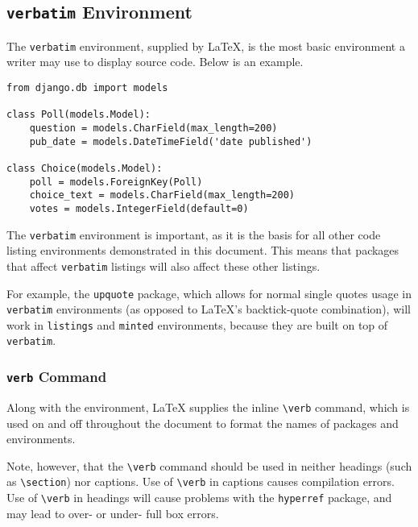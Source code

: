 
\subsection{\texttt{verbatim} Environment}

The \verb|verbatim| environment, supplied by \LaTeX , is the most basic environment a writer may use to display source code. Below is an example.

\begin{verbatim}
from django.db import models

class Poll(models.Model):
    question = models.CharField(max_length=200)
    pub_date = models.DateTimeField('date published')

class Choice(models.Model):
    poll = models.ForeignKey(Poll)
    choice_text = models.CharField(max_length=200)
    votes = models.IntegerField(default=0)
\end{verbatim}

The \verb|verbatim| environment is important, as it is the basis for all other code listing environments demonstrated in this document. This means that packages that affect \verb|verbatim| listings will also affect these other listings.

For example, the \verb|upquote| package, which allows for normal single quotes usage in \verb|verbatim| environments (as opposed to \LaTeX 's backtick-quote combination), will work in \verb|listings| and \verb|minted| environments, because they are built on top of \verb|verbatim|. 

\subsubsection{\texttt{verb} Command}

Along with the environment, \LaTeX{} supplies the inline \verb|\verb| command, which is used on and off throughout the document to format the names of packages and environments.

Note, however, that the \verb|\verb| command should be used in neither headings (such as \verb|\section|) nor captions. Use of \verb|\verb| in captions causes compilation errors. Use of \verb|\verb| in headings will cause problems with the \verb|hyperref| package, and may lead to over- or under- full box errors. 

